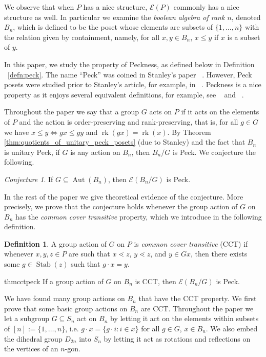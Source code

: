 \documentclass[smallextended, envcountsame, numbook]{svjour3}
\theoremstyle{plain}
\theoremstyle{definition}
\newtheorem{defn}[thm]{Definition}
\theoremstyle{remark}
\newtheorem{conj}[thm]{Conjecture}
\numberwithin{equation}{section}
\renewcommand{\iff}{\Leftrightarrow}
\newcommand\rk{\operatorname{rk}}
\newcommand\Stab{\operatorname{Stab}}
\newcommand\Aut{\operatorname{Aut}}
\begin{document}
We observe that when $P$ has a nice structure, $\mathcal E(P)$ commonly has a nice structure as well.  In particular we examine the \textit{boolean algebra of rank $n$}, denoted $B_n$, which is defined to be the poset whose elements are subsets of $\{1,\ldots,n\}$ with the relation given by containment, namely, for all $x,y\in B_n$, $x\le y$ if $x$ is a subset of $y$.

In this paper, we study the property of Peckness, as defined below
in Definition ~\ref{defn:peck}. The name 
``Peck'' was coined in Stanley's paper ~\cite{quotients_stanley}. However, Peck posets were studied prior to Stanley's article, for example, in
~\cite{weyl_groups_stanley}. Peckness is a nice property
as it enjoys several equivalent definitions, for example, see
~\cite[Lemma 1.1]{weyl_groups_stanley} and ~\cite{proctor}.

Throughout the paper we say that a group $G$ acts on $P$ if it acts on the elements of $P$ and the action is order-preserving and rank-preserving, that is, for all $g \in G$ we have $x \leq y \iff gx \leq gy$ and $\rk(gx) = \rk(x)$. 
By Theorem \ref{thm:quotients_of_unitary_peck_posets} (due to Stanley) and the fact that $B_n$ is unitary Peck, if $G$ is any action on $B_n$, then $B_n/G$ is Peck.  We conjecture the following.

\begin{conj}\label{conj:F_of_BnG_Peck}
If $G \subseteq \Aut(B_n)$, then $\mathcal E(B_n/G)$ is Peck.
\end{conj}

In the rest of the paper we give theoretical evidence of the conjecture. More precisely, we prove that the conjecture holds whenever the group action of $G$ on $B_n$ has the \emph{common cover transitive} property, which we introduce in the following definition.

\begin{defn}
\label{defn:cover_transitive}
A group action of $G$ on $P$ is \textit{common cover transitive} (CCT) if whenever $x,y,z\in P$ are such that $x\lessdot z$, $y\lessdot z$, and $y\in Gx$, then there exists some $g\in \Stab(z)$ such that $g\cdot x = y$.
\end{defn}

\begin{restatable}{thm}{cctpeck}
\label{thm:cover_transitive_implies_Peck}
If a group action of $G$ on $B_n$ is CCT, then $\mathcal E(B_n/G)$ is Peck.
\end{restatable}

We have found many group actions on $B_n$ that have the CCT property.  We first prove that some basic group actions on $B_n$ are CCT.  Throughout the paper we let a subgroup $G\subseteq S_n$ act on $B_n$ by letting it act on the elements within subsets of $[n]:= \{1,\ldots, n\}$, i.e. $g\cdot x = \{g\cdot i\colon i\in x\}$  for all $g\in G$, $x\in B_n$.  We also embed the dihedral group $D_{2n}$ into $S_n$ by letting it act as rotations and reflections on the vertices of an $n$-gon.
\end{document}
